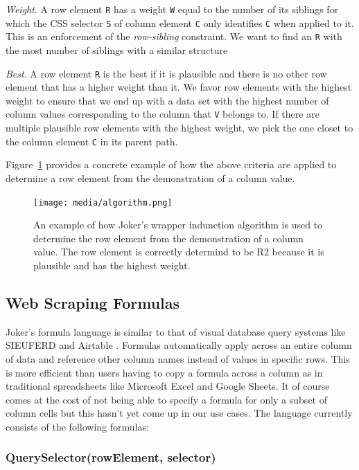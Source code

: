 \documentclass[sigconf,10pt]{acmart}
\begin{document}
\emph{Weight}. A row element \texttt{R} has a weight \texttt{W} equal to
the number of its siblings for which the CSS selector \texttt{S} of
column element \texttt{C} only identifies \texttt{C} when applied to it.
This is an enforcement of the \emph{row-sibling} constraint. We want to
find an \texttt{R} with the most number of siblings with a similar
structure

\emph{Best}. A row element \texttt{R} is the best if it is plausible and
there is no other row element that has a higher weight than it. We favor
row elements with the highest weight to ensure that we end up with a
data set with the highest number of column values corresponding to the
column that \texttt{V} belongs to. If there are multiple plausible row
elements with the highest weight, we pick the one closet to the column
element \texttt{C} in its parent path.

Figure~\ref{fig:algorithm} provides a concrete example of how the above
criteria are applied to determine a row element from the demonstration
of a column value.

\begin{figure}
  \texttt{[image: media/algorithm.png]}
  \caption{\label{fig:algorithm} An example of how Joker's wrapper indunction algorithm is used to determine the row element from the demonstration of a column value. The row element is correctly determind to be R2 because it is plausible and has the highest weight.}
\end{figure}

\hypertarget{web-scraping-formulas}{%
\subsection{Web Scraping Formulas}\label{web-scraping-formulas}}

Joker's formula language is similar to that of visual database query
systems like SIEUFERD \citep{bakke2016} and Airtable \citep{2021f}.
Formulas automatically apply across an entire column of data and
reference other column names instead of values in specific rows. This is
more efficient than users having to copy a formula across a column as in
traditional spreadsheets like Microsoft Excel and Google Sheets. It of
course comes at the cost of not being able to specify a formula for only
a subset of column cells but this hasn't yet come up in our use cases.
The language currently consists of the following formulas:

\hypertarget{queryselectorrowelement-selector}{%
\subsubsection{QuerySelector(rowElement,
selector)}\label{queryselectorrowelement-selector}}
\end{document}
